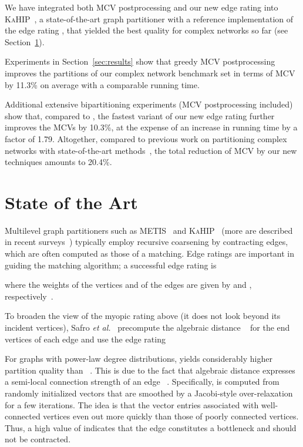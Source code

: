 \documentclass[pdftex]{llncs}
\newcommand{\etal}{\textit{et al.}\xspace}
\newcommand{\metis}{\textsc{METIS}\xspace}
\newcommand{\kahip}{\textsc{KaHIP}\xspace}
\numberwithin{equation}{section}
\numberwithin{example}{section}
\numberwithin{table}{section}
\begin{document}
We have integrated both MCV postprocessing and our new edge rating
 into \kahip~\cite{kaHIPHomePage,sandersschulz2013}, a
state-of-the-art graph partitioner with a reference implementation of
the edge rating , that yielded the best quality for
complex networks so far (see Section~\ref{sec:soa}).


Experiments in Section~\ref{sec:results} show that greedy MCV
postprocessing improves the partitions of our complex network
benchmark set in terms of MCV by 11.3\% on average with a comparable
running time.


Additional extensive bipartitioning experiments (MCV postprocessing
included) show that, compared to , the fastest variant
of our new edge rating further improves the MCVs by 10.3\%, at the
expense of an increase in running time by a factor of
1.79. Altogether, compared to previous work on partitioning complex
networks with state-of-the-art methods~\cite{Safro2012a}, the total
reduction of MCV by our new techniques amounts to 20.4\%.




\section{State of the Art}
\label{sec:soa}
Multilevel graph partitioners such as \metis~\cite{karypis1998fast} and \kahip~\cite{kaHIPHomePage,sandersschulz2013} (more are described in recent surveys~\cite{GPOverviewBook,SPPGPOverviewPaper}) typically employ recursive
coarsening by contracting edges, which are often computed as those of a matching.
Edge ratings are important in guiding the matching
algorithm; a successful edge rating is



\noindent where the weights of the vertices  and of the edges  are given by  and , respectively~\cite{HoltgreweSS10engineering}.

To broaden the view of the myopic rating above (it does not look beyond its
incident vertices), Safro
\etal~\cite{Safro2012a} precompute the algebraic distance
~\cite{Chen2011a} for the end vertices
of each edge  and use the edge rating



\noindent For graphs with power-law degree distributions,  yields
considerably higher partition quality than ~\cite{Safro2012a}.
This is due to the fact that algebraic distance expresses a semi-local connection
strength of an edge ~\cite{Chen2011a}. Specifically,  is
computed from  randomly initialized vectors that are smoothed by a Jacobi-style
over-relaxation for a few iterations. 
The idea is that the vector entries associated with
well-connected vertices even out more quickly than those of
poorly connected vertices. Thus, a high value of 
indicates that the edge  constitutes a bottleneck and should
not be contracted. 
\end{document}
